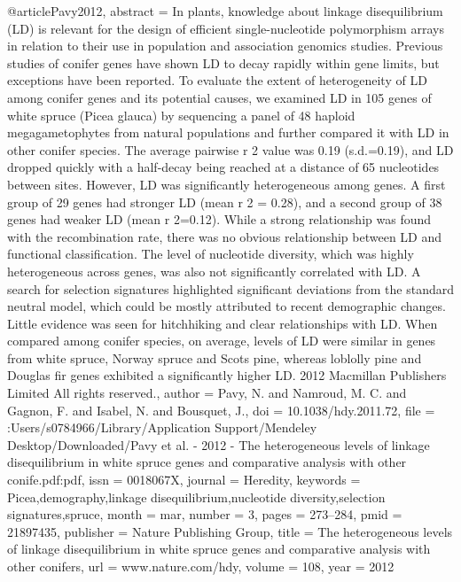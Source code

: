 @article{Pavy2012,
abstract = {In plants, knowledge about linkage disequilibrium (LD) is relevant for the design of efficient single-nucleotide polymorphism arrays in relation to their use in population and association genomics studies. Previous studies of conifer genes have shown LD to decay rapidly within gene limits, but exceptions have been reported. To evaluate the extent of heterogeneity of LD among conifer genes and its potential causes, we examined LD in 105 genes of white spruce (Picea glauca) by sequencing a panel of 48 haploid megagametophytes from natural populations and further compared it with LD in other conifer species. The average pairwise r 2 value was 0.19 (s.d.=0.19), and LD dropped quickly with a half-decay being reached at a distance of 65 nucleotides between sites. However, LD was significantly heterogeneous among genes. A first group of 29 genes had stronger LD (mean r 2 = 0.28), and a second group of 38 genes had weaker LD (mean r 2=0.12). While a strong relationship was found with the recombination rate, there was no obvious relationship between LD and functional classification. The level of nucleotide diversity, which was highly heterogeneous across genes, was also not significantly correlated with LD. A search for selection signatures highlighted significant deviations from the standard neutral model, which could be mostly attributed to recent demographic changes. Little evidence was seen for hitchhiking and clear relationships with LD. When compared among conifer species, on average, levels of LD were similar in genes from white spruce, Norway spruce and Scots pine, whereas loblolly pine and Douglas fir genes exhibited a significantly higher LD. {\textcopyright} 2012 Macmillan Publishers Limited All rights reserved.},
author = {Pavy, N. and Namroud, M. C. and Gagnon, F. and Isabel, N. and Bousquet, J.},
doi = {10.1038/hdy.2011.72},
file = {:Users/s0784966/Library/Application Support/Mendeley Desktop/Downloaded/Pavy et al. - 2012 - The heterogeneous levels of linkage disequilibrium in white spruce genes and comparative analysis with other conife.pdf:pdf},
issn = {0018067X},
journal = {Heredity},
keywords = {Picea,demography,linkage disequilibrium,nucleotide diversity,selection signatures,spruce},
month = {mar},
number = {3},
pages = {273--284},
pmid = {21897435},
publisher = {Nature Publishing Group},
title = {{The heterogeneous levels of linkage disequilibrium in white spruce genes and comparative analysis with other conifers}},
url = {www.nature.com/hdy},
volume = {108},
year = {2012}
}
